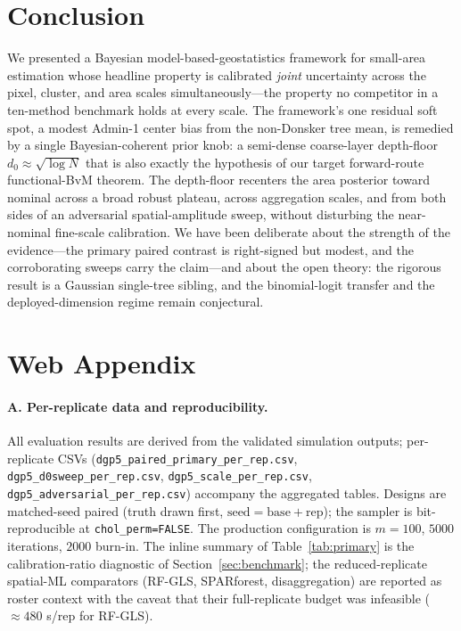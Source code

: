 \documentclass[11pt]{article}
\theoremstyle{remark}
\newcommand{\dz}{d_0}
\begin{document}
\section{Conclusion}\label{sec:conclusion}

We presented a Bayesian model-based-geostatistics framework for small-area
estimation whose headline property is calibrated \emph{joint} uncertainty across
the pixel, cluster, and area scales simultaneously---the property no competitor in
a ten-method benchmark holds at every scale. The framework's one residual soft
spot, a modest Admin-1 center bias from the non-Donsker tree mean, is remedied by a
single Bayesian-coherent prior knob: a semi-dense coarse-layer depth-floor
$\dz\approx\sqrt{\log N}$ that is also exactly the hypothesis of our target
forward-route functional-BvM theorem. The depth-floor recenters the area posterior
toward nominal across a broad robust plateau, across aggregation scales, and from
both sides of an adversarial spatial-amplitude sweep, without disturbing the
near-nominal fine-scale calibration. We have been deliberate about the strength of
the evidence---the primary paired contrast is right-signed but modest, and the
corroborating sweeps carry the claim---and about the open theory: the rigorous
result is a Gaussian single-tree sibling, and the binomial-logit transfer and the
deployed-dimension regime remain conjectural.

\section*{Web Appendix}\label{sec:appendix}

\paragraph{A. Per-replicate data and reproducibility.}
All evaluation results are derived from the validated simulation outputs;
per-replicate CSVs (\texttt{dgp5\_paired\_primary\_per\_rep.csv},
\texttt{dgp5\_d0sweep\_per\_rep.csv}, \texttt{dgp5\_scale\_per\_rep.csv},
\texttt{dgp5\_adversarial\_per\_rep.csv}) accompany the aggregated tables. Designs
are matched-seed paired (truth drawn first, $\mathrm{seed}=\mathrm{base}+
\mathrm{rep}$); the sampler is bit-reproducible at \texttt{chol\_perm=FALSE}. The
production configuration is $m=100$, $5000$ iterations, $2000$ burn-in. The
inline summary of Table~\ref{tab:primary} is the calibration-ratio diagnostic of
Section~\ref{sec:benchmark}; the reduced-replicate spatial-ML comparators
(RF-GLS, SPARforest, disaggregation) are reported as roster context with the
caveat that their full-replicate budget was infeasible ($\approx480$ s/rep for
RF-GLS).
\end{document}

